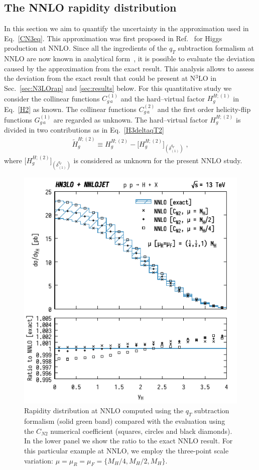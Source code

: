 \documentclass[12pt]{article}
\def\beeq{\begin{eqnarray}}
\def\eeeq{\end{eqnarray}}
\DeclareRobustCommand{\qt}{q_T}
\begin{document}
\subsection{The NNLO rapidity distribution}
\label{sec:NNLOrap}
In this section we aim to quantify the uncertainty in the approximation used in Eq.~\eqref{CN3eq}. This approximation was first proposed in Ref.~\cite{Bozzi:2005wk} for Higgs production at NNLO. Since all the ingredients of the $\qt$ subtraction formalism at NNLO are now known in analytical form~\cite{Catani:2011kr}, it is possible to evaluate the deviation caused by the approximation from the exact result. This analysis allows to assess the deviation from the exact result that could be present at N$^3$LO in Sec.~\ref{sec:N3LOrap} and \ref{sec:results} below. For this quantitative study we consider the collinear functions $C^{(1)}_{g\,a}$ and the hard--virtual factor $H^{H;(1)}_g$ in Eq.~\eqref{H2} as known. The collinear functions $C^{(2)}_{g\,a}$ and the first order helicity-flip functions $G^{(1)}_{g\,a}$ are regarded as unknown. The hard--virtual factor $H^{H;(2)}_g$ is divided in two contributions as in Eq.~\eqref{H3deltaqT2}
\beeq
\widetilde{H}^{H;(2)}_{g}  \equiv H^{H;(2)}_g  -  \big[H^{H;(2)}_{g}\big]_{(\delta^{\qt}_{(1)})} \;,
\eeeq
where $\big[H^{H;(2)}_{g}\big]_{(\delta^{\qt}_{(1)})}$ is considered as unknown for the present NNLO study. 
\begin{figure}[t]
\centering
\includegraphics[width=.6\linewidth]{./new_figures/yH_B02_CN}
\caption{\label{fig:yHCN}{Rapidity distribution at NNLO computed using the $\qt$ subtraction formalism (solid green band) compared with the evaluation using the $C_{N2}$ numerical coefficient (squares, circles and black diamonds). In the lower panel we show the ratio to the exact NNLO result. For this particular example at NNLO, we employ the three-point scale variation: $\mu=\mu_{R}=\mu_{F}=\{M_{H}/4,M_{H}/2,M_{H}\}$. 
}}
\end{figure}
\end{document}
